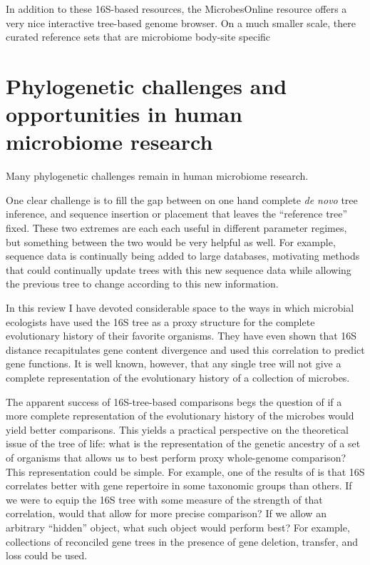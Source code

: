 \documentclass{amsart}
\begin{document}
In addition to these 16S-based resources, the MicrobesOnline resource \citep{dehal2010microbesonline} offers a very nice interactive tree-based genome browser.
On a much smaller scale, there curated reference sets that are microbiome body-site specific \citep{chen2010human,griffen2011core,srinivasan2012bacterial}



\section{Phylogenetic challenges and opportunities in human microbiome research}

Many phylogenetic challenges remain in human microbiome research.

One clear challenge is to fill the gap between on one hand complete \emph{de novo} tree inference, and sequence insertion or placement that leaves the ``reference tree'' fixed.
These two extremes are each each useful in different parameter regimes, but something between the two would be very helpful as well.
For example, sequence data is continually being added to large databases, motivating methods that could continually update trees with this new sequence data while allowing the previous tree to change according to this new information.

In this review I have devoted considerable space to the ways in which microbial ecologists have used the 16S tree as a proxy structure for the complete evolutionary history of their favorite organisms.
They have even shown that 16S distance recapitulates gene content divergence and used this correlation to predict gene functions.
It is well known, however, that any single tree will not give a complete representation of the evolutionary history of a collection of microbes.

The apparent success of 16S-tree-based comparisons begs the question of if a more complete representation of the evolutionary history of the microbes would yield better comparisons.
This yields a practical perspective on the theoretical issue of the tree of life: what is the representation of the genetic ancestry of a set of organisms that allows us to best perform proxy whole-genome comparison?
This representation could be simple.
For example, one of the results of \citet{zaneveld2010ribosomal} is that 16S correlates better with gene repertoire in some taxonomic groups than others.
If we were to equip the 16S tree with some measure of the strength of that correlation, would that allow for more precise comparison?
If we allow an arbitrary ``hidden'' object, what such object would perform best?
For example, collections of reconciled gene trees in the presence of gene deletion, transfer, and loss \citep[see][for interesting recent results]{szollHosi2013efficient,szollHosi2013lateral} could be used.
\end{document}

